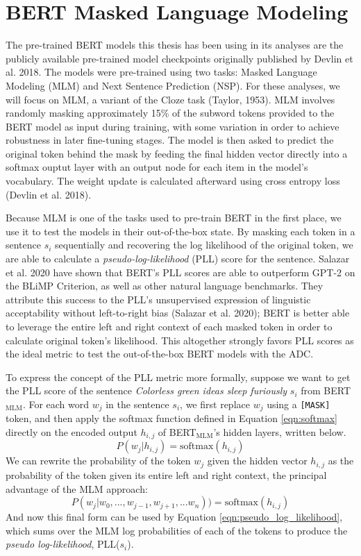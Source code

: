 \section{BERT Masked Language Modeling}
The pre-trained BERT models this thesis has been using in its analyses are the publicly available pre-trained model checkpoints originally published by Devlin et al. 2018.  The models were pre-trained using two tasks: Masked Language Modeling (MLM) and Next Sentence Prediction (NSP).  For these analyses, we will focus on MLM, a variant of the Cloze task (Taylor, 1953).  MLM involves randomly masking approximately 15\% of the subword tokens provided to the BERT model as input during training, with some variation in order to achieve robustness in later fine-tuning stages.  The model is then asked to predict the original token behind the mask by feeding the final hidden vector directly into a softmax ouptut layer with an output node for each item in the model's vocabulary.  The weight update is calculated afterward using cross entropy loss (Devlin et al. 2018).  

Because MLM is one of the tasks used to pre-train BERT in the first place, we use it to test the models in their out-of-the-box state.  By masking each token in a sentence $s_i$ sequentially and recovering the log likelihood of the original token, we are able to calculate a \textit{pseudo-log-likelihood} (PLL) score for the sentence.  Salazar et al. 2020 have shown that BERT's PLL scores are able to outperform GPT-2 on the BLiMP Criterion, as well as other natural language benchmarks.  They attribute this success to the PLL's unsupervised expression of linguistic acceptability without left-to-right bias (Salazar et al. 2020); BERT is better able to leverage the entire left and right context of each masked token in order to calculate original token's likelihood.  This altogether strongly favors PLL scores as the ideal metric to test the out-of-the-box BERT models with the ADC.

To express the concept of the PLL metric more formally, suppose we want to get the PLL score of the sentence \textit{Colorless green ideas sleep furiously} $s_i$ from BERT$_{\mathrm{MLM}}$.  For each word $w_j$ in the sentence $s_i$, we first replace $w_j$ using a \texttt{[MASK]} token, and then apply the softmax function defined in Equation \ref{eqn:softmax} directly on the encoded output $h_{i,j}$ of BERT$_{\mathrm{MLM}}$'s hidden layers, written below.
\begin{equation}
    P(w_j|h_{i,j}) = \mathrm{softmax}(h_{i,j})
    \label{eqn:mlm_token_prob_a}
\end{equation}
We can rewrite the probability of the token $w_j$ given the hidden vector $h_{i,j}$ as the probability of the token given its entire left and right context, the principal advantage of the MLM approach:
\begin{equation}
    P(w_j|w_0,...,w_{j-1},w_{j+1},...w_n)) = \mathrm{softmax}(h_{i,j})
    \label{eqn:mlm_token_prob_b}
\end{equation}
And now this final form can be used by Equation \ref{eqn:pseudo_log_likelihood}, which sums over the MLM log probabilities of each of the tokens to produce the \textit{pseudo log-likelihood}, PLL($s_i$).

